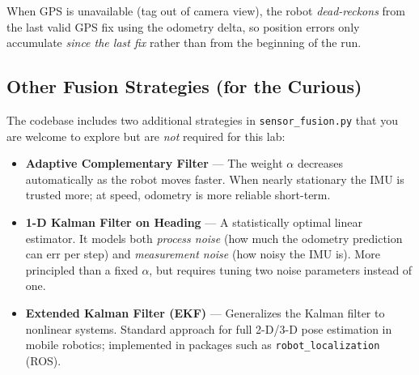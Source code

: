 \documentclass[12pt,letterpaper]{article}
\begin{document}
When GPS is unavailable (tag out of camera view), the robot
\emph{dead-reckons} from the last valid GPS fix using the odometry delta,
so position errors only accumulate \emph{since the last fix} rather than from
the beginning of the run.

\subsection{Other Fusion Strategies (for the Curious)}

The codebase includes two additional strategies in \texttt{sensor\_fusion.py}
that you are welcome to explore but are \emph{not} required for this lab:

\begin{itemize}
  \item \textbf{Adaptive Complementary Filter} ---
        The weight $\alpha$ decreases automatically as the robot moves faster.
        When nearly stationary the IMU is trusted more; at speed,
        odometry is more reliable short-term.

  \item \textbf{1-D Kalman Filter on Heading} ---
        A statistically optimal linear estimator. It models both
        \textit{process noise} (how much the odometry prediction can err per
        step) and \textit{measurement noise} (how noisy the IMU is).
        More principled than a fixed $\alpha$, but requires tuning two noise
        parameters instead of one.

  \item \textbf{Extended Kalman Filter (EKF)} ---
        Generalizes the Kalman filter to nonlinear systems. Standard approach
        for full 2-D/3-D pose estimation in mobile robotics; implemented in
        packages such as \texttt{robot\_localization} (ROS).
\end{itemize}



\end{document}
